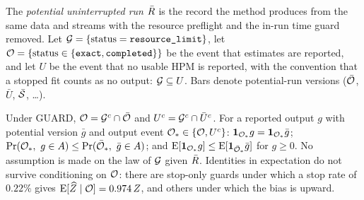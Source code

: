 \begin{definition}\label{def:potential}
The \emph{potential uninterrupted run} $\bar R$ is the record the method produces from the same data and streams with
the resource preflight and the in-run time guard removed. Let $\mathcal G=\{\text{status}=\texttt{resource\_limit}\}$, let
$\mathcal O=\{\text{status}\in\{\texttt{exact},\texttt{completed}\}\}$ be the event that estimates are reported, and let $U$ be
the event that no usable HPM is reported, with the convention that a stopped fit counts as no output:
$\mathcal G\subseteq U$. Bars denote potential-run versions ($\bar{\mathcal O}$, $\bar U$, $\bar{\mathcal S}$, \dots).
\end{definition}

\begin{lemma}\label{lem:RO}
Under GUARD, $\mathcal O=\mathcal G^c\cap\bar{\mathcal O}$ and $U^c=\mathcal G^c\cap\bar U^c$. For a reported output $g$ with potential version
$\bar g$ and output event $\mathcal O_\ast\in\{\mathcal O,U^c\}$: $\mathbf 1_{\mathcal O_\ast}g=\mathbf 1_{\mathcal O_\ast}\bar g$;
$\Pr(\mathcal O_\ast,\ g\in A)\le\Pr(\bar{\mathcal O}_\ast,\ \bar g\in A)$; and $\mathrm E[\mathbf 1_{\mathcal O_\ast}g]\le\mathrm E[\mathbf
1_{\bar{\mathcal O}_\ast}\bar g]$ for $g\ge0$. No assumption is made on the law of $\mathcal G$ given $\bar R$. Identities in
expectation do not survive conditioning on $\mathcal O$: there are stop-only guards under which a stop rate of $0.22\%$ gives
$\mathrm E[\widehat Z\mid\mathcal O]=0.974\,Z$, and others under which the bias is upward.
\end{lemma}

